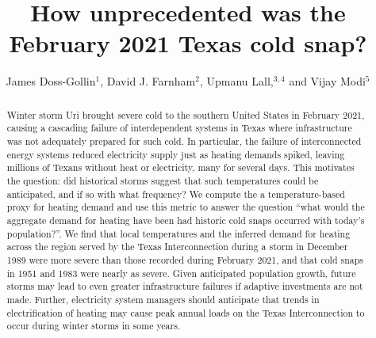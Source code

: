 \documentclass[12pt]{iopart}
\begin{document}
\title{How unprecedented was the February 2021 Texas cold snap?}

\author{James Doss-Gollin$^1$, David J. Farnham$^2$, Upmanu Lall,$^{3,4}$ and Vijay Modi$^5$}
\address{$^1$ Department of Civil and Environmental Engineering, Rice University, Houston, TX, USA (ORCID 0000-0002-3428-2224)}
\address{$^2$ Department of Global Ecology, Carnegie Institution for Science, Stanford, CA, USA (ORCID 0000-0002-6690-4251)}
\address{$^3$ Columbia Water Center, Columbia University, New York, NY, USA (ORCID 0000-0003-0529-8128)}
\address{$^4$ Department of Earth and Environmental Engineering, Columbia University, New York, NY, USA}
\address{$^4$ Department of Mechanical Engineering, Columbia University, New York, NY, USA (ORCID 0000-0003-2513-0437)}
\vspace{10pt}

\begin{abstract}
  Winter storm Uri brought severe cold to the southern United States in February 2021, causing a cascading failure of interdependent systems in Texas where infrastructure was not adequately prepared for such cold.
  In particular, the failure of interconnected energy systems reduced electricity supply just as heating demands spiked, leaving millions of Texans without heat or electricity, many for several days.
  This motivates the question: did historical storms suggest that such temperatures could be anticipated, and if so with what frequency?
  We compute the a temperature-based proxy for heating demand and use this metric to answer the question ``what would the aggregate demand for heating have been had historic cold snaps occurred with today's population?''.
  We find that local temperatures and the inferred demand for heating across the region served by the Texas Interconnection during a storm in December 1989 were more severe than those recorded during February 2021, and that cold snaps in 1951 and 1983 were nearly as severe.
  Given anticipated population growth, future storms may lead to even greater infrastructure failures if adaptive investments are not made.
  Further, electricity system managers should anticipate that trends in electrification of heating may cause peak annual loads on the Texas Interconnection to occur during winter storms in some years.
\end{abstract}

\submitto{\ERL}
\maketitle
\end{document}
